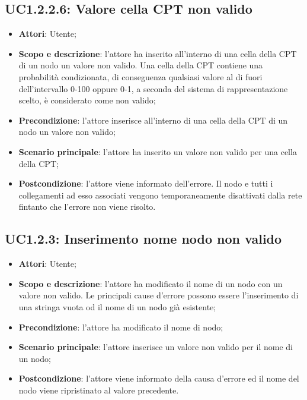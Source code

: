 \subsection{UC1.2.2.6: Valore cella CPT non valido} 
\hypertarget{UC1.2.2.6}{} 
\begin{itemize} 
	\item{\textbf{Attori}: Utente;} 
	\item{\textbf{Scopo e descrizione}: l'attore ha inserito all'interno di una cella della CPT di un nodo un valore non valido. Una cella della CPT contiene una probabilità condizionata, di conseguenza qualsiasi valore al di fuori dell'intervallo 0-100 oppure 0-1, a seconda del sistema di rappresentazione scelto, è considerato come non valido;} 
	\item{\textbf{Precondizione}: l'attore inserisce all'interno di una cella della CPT di un nodo un valore non valido;}
	\item{\textbf{Scenario principale}: l'attore ha inserito un valore non valido per una cella della CPT;}  
	\item{\textbf{Postcondizione}: l'attore viene informato dell'errore. Il nodo e tutti i collegamenti ad esso associati vengono temporaneamente disattivati dalla rete fintanto che l'errore non viene risolto.} 
\end{itemize}
\subsection{UC1.2.3: Inserimento nome nodo non valido} 
\hypertarget{UC1.2.3}{} 
\begin{itemize} 
	\item{\textbf{Attori}: Utente;} 
	\item{\textbf{Scopo e descrizione}: l'attore ha modificato il nome di un nodo con un valore non valido. Le principali cause d'errore possono essere l'inserimento di una stringa vuota od il nome di un nodo già esistente;} 
	\item{\textbf{Precondizione}: l'attore ha modificato il nome di nodo;}
	\item{\textbf{Scenario principale}: l'attore inserisce un valore non valido per il nome di un nodo;}  
	\item{\textbf{Postcondizione}: l'attore viene informato della causa d'errore ed il nome del nodo viene ripristinato al valore precedente.} 
\end{itemize} 
